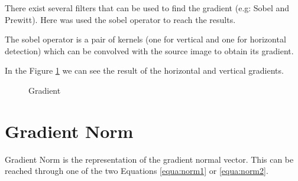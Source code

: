 \documentclass{article}
\begin{document}
There exist several filters that can be used to find the gradient (e.g: Sobel and Prewitt). Here was used the sobel operator to reach the results.

The sobel operator is a pair of kernels (one for vertical and one for horizontal detection) which can be convolved with the source image to obtain its gradient.

In the Figure \ref{fig:gradient} we can see the result of the horizontal and vertical gradients.

	\begin{figure}[H]
	\centering
	\caption{Gradient}
	\label{fig:gradient}
	\end{figure}


\section{Gradient Norm}

Gradient Norm is the representation of the gradient normal vector. This can be reached through one of the two Equations \ref{equa:norm1} or \ref{equa:norm2}.
\end{document}
